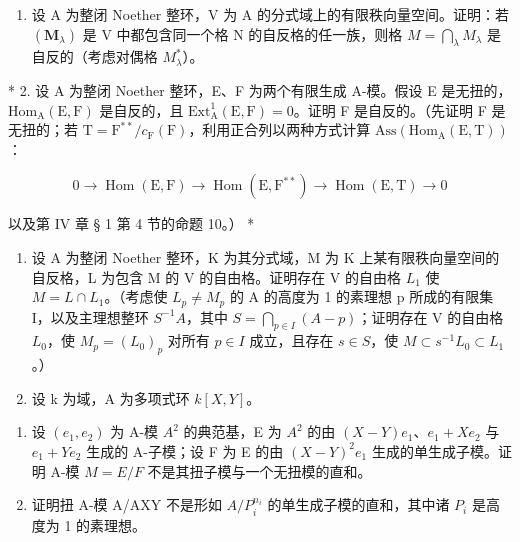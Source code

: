 
\begin{enumerate}
\def\labelenumi{\arabic{enumi}.}
\tightlist
\item
  设 A 为整闭 Noether 整环，V 为 A 的分式域上的有限秩向量空间。证明：若 \((\mathbf{M}_{\lambda})\) 是 V 中都包含同一个格 N 的自反格的任一族，则格 \(M = \bigcap_{\lambda} M_{\lambda}\) 是自反的（考虑对偶格 \(M_{\lambda}^{*}\)）。
\end{enumerate}

* 2. 设 A 为整闭 Noether 整环，E、F 为两个有限生成 A-模。假设 E 是无扭的，\(\mathrm{Hom}_{\mathrm{A}}(\mathrm{E},\mathrm{F})\) 是自反的，且 \(\mathrm{Ext}_{\mathrm{A}}^{1}(\mathrm{E},\mathrm{F}) = 0\)。证明 F 是自反的。（先证明 F 是无扭的；若 \(\mathrm{T} = \mathrm{F}^{**}/c_{\mathrm{F}}(\mathrm{F})\)，利用正合列以两种方式计算 \(\mathrm{Ass}(\mathrm{Hom}_{\mathrm{A}}(\mathrm{E},\mathrm{T}))\)：

\[
0 \rightarrow \operatorname{Hom} (\mathrm{E}, \mathrm{F}) \rightarrow \operatorname{Hom} (\mathrm{E}, \mathrm{F} ^ {* *}) \rightarrow \operatorname{Hom} (\mathrm{E}, \mathrm{T}) \rightarrow 0
\]

以及第 IV 章 § 1 第 4 节的命题 10。） *

\begin{enumerate}
\def\labelenumi{\arabic{enumi}.}
\setcounter{enumi}{2}
\item
  设 A 为整闭 Noether 整环，K 为其分式域，M 为 K 上某有限秩向量空间的自反格，L 为包含 M 的 V 的自由格。证明存在 V 的自由格 \(L_{1}\) 使 \(M = L \cap L_{1}\)。（考虑使 \(L_{p} \neq M_{p}\) 的 A 的高度为 1 的素理想 p 所成的有限集 I，以及主理想整环 \(S^{-1}A\)，其中 \(S = \bigcap_{p \in I} (A - p)\)；证明存在 V 的自由格 \(L_{0}\)，使 \(M_{p} = (L_{0})_{p}\) 对所有 \(p \in I\) 成立，且存在 \(s \in S\)，使 \(M \subset s^{-1}L_{0} \subset L_{1}\)。）
\item
  设 k 为域，A 为多项式环 \(k[X, Y]\)。
\end{enumerate}

\begin{enumerate}
\def\labelenumi{(\alph{enumi})}
\item
  设 \((e_1, e_2)\) 为 A-模 \(A^2\) 的典范基，E 为 \(A^2\) 的由 \((X - Y)e_1\)、\(e_1 + Xe_2\) 与 \(e_1 + Ye_2\) 生成的 A-子模；设 F 为 E 的由 \((X - Y)^2e_1\) 生成的单生成子模。证明 A-模 \(M = E / F\) 不是其扭子模与一个无扭模的直和。
\item
  证明扭 A-模 A/AXY 不是形如 \(A/P_{i}^{n_{i}}\) 的单生成子模的直和，其中诸 \(P_{i}\) 是高度为 1 的素理想。
\end{enumerate}

